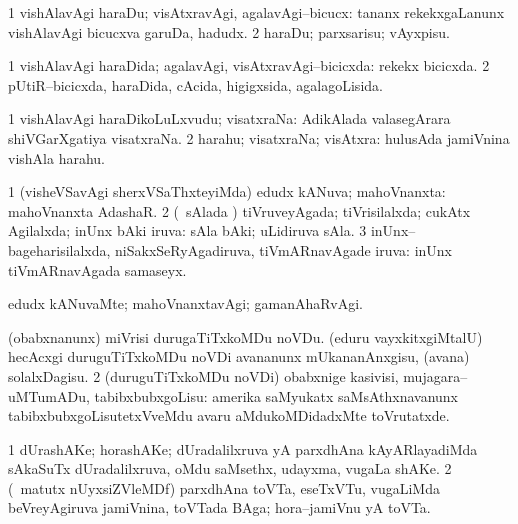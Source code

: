 \bentry
{}
\gl{\sakirx}
\bmng
\bnum
\num{1} vishAlavAgi haraDu; visAtxravAgi, agalavAgi--bicucx:  tananx rekekxgaLanunx vishAlavAgi bicucxva garuDa, hadudx. 
\num{2} haraDu; parxsarisu; vAyxpisu. 
\enum
\emng
\eentry

\bentry
{}
\gl{\gu}
\bmng
\bnum
\num{1} vishAlavAgi haraDida; agalavAgi, visAtxravAgi--bicicxda:  rekekx bicicxda. 
\num{2} pUtiR--bicicxda, haraDida, cAcida, higigxsida, agalagoLisida. 
\enum
\emng
\eentry

\bentry
{}
\gl{\nA}
\bmng
\bnum
\num{1} vishAlavAgi haraDikoLuLxvudu; visatxraNa:  AdikAlada valasegArara shiVGarXgatiya visatxraNa. 
\num{2} harahu; visatxraNa; visAtxra:  hulusAda jamiVnina vishAla harahu. 
\enum
\emng
\eentry

\bentry
{}
\gl{\gu}
\bmng
\bnum
\num{1} (visheVSavAgi sherxVSaThxteyiMda) edudx kANuva; mahoVnanxta:  mahoVnanxta AdashaR. 
\num{2} (\kanmu\ sAlada \vi) tiVruveyAgada; tiVrisilalxda; cukAtx Agilalxda; inUnx bAki iruva:  sAla bAki; uLidiruva sAla. 
\num{3} inUnx--bageharisilalxda, niSakxSeRyAgadiruva, tiVmARnavAgade iruva:  inUnx tiVmARnavAgada samaseyx. 
\enum
\emng
\eentry

\bentry
{}
\gl{\kirxvi}
\bmng
edudx kANuvaMte; mahoVnanxtavAgi; gamanAhaRvAgi. 
\emng
\eentry

\bentry
{}
\gl{\sakirx}
\bmng
\bnum
{} 
\banum
{} (obabxnanunx) miVrisi durugaTiTxkoMDu noVDu. 
 (eduru vayxkitxgiMtalU) hecAcxgi duruguTiTxkoMDu noVDi avananunx mUkananAnxgisu, (avana) solalxDagisu. 
\eanum
\numie
\num{2} (duruguTiTxkoMDu noVDi) obabxnige kasivisi, mujagara--uMTumADu, tabibxbubxgoLisu:  amerika saMyukatx saMsAthxnavanunx tabibxbubxgoLisutetxVveMdu avaru aMdukoMDidadxMte toVrutatxde. 
\enum
\emng
\eentry

\bentry
{}
\gl{\nA}
\bmng
\bnum
\num{1} dUrashAKe; horashAKe; dUradalilxruva yA parxdhAna kAyARlayadiMda sAkaSuTx dUradalilxruva, oMdu saMsethx, udayxma, \mo vugaLa shAKe. 
\num{2} (\AseTxrXV\ matutx nUyxsiZVleMDf) parxdhAna toVTa, eseTxVTu, \mo vugaLiMda beVreyAgiruva jamiVnina, toVTada BAga; hora--jamiVnu yA toVTa. 
\enum
\emng
\eentry

